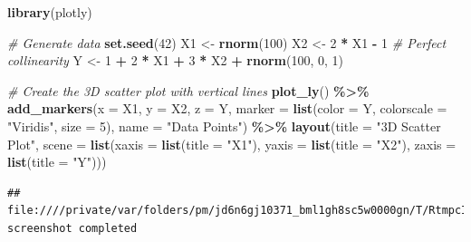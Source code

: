 \documentclass[
]{book}
\newenvironment{Shaded}{\begin{snugshade}}{\end{snugshade}}
\newcommand{\AttributeTok}[1]{\textcolor[rgb]{0.13,0.29,0.53}{#1}}
\newcommand{\CommentTok}[1]{\textcolor[rgb]{0.56,0.35,0.01}{\textit{#1}}}
\newcommand{\DecValTok}[1]{\textcolor[rgb]{0.00,0.00,0.81}{#1}}
\newcommand{\FunctionTok}[1]{\textcolor[rgb]{0.13,0.29,0.53}{\textbf{#1}}}
\newcommand{\NormalTok}[1]{#1}
\newcommand{\OtherTok}[1]{\textcolor[rgb]{0.56,0.35,0.01}{#1}}
\newcommand{\SpecialCharTok}[1]{\textcolor[rgb]{0.81,0.36,0.00}{\textbf{#1}}}
\newcommand{\StringTok}[1]{\textcolor[rgb]{0.31,0.60,0.02}{#1}}
\begin{document}
\begin{Shaded}
\begin{Highlighting}[]
\FunctionTok{library}\NormalTok{(plotly)}

\CommentTok{\# Generate data}
\FunctionTok{set.seed}\NormalTok{(}\DecValTok{42}\NormalTok{)}
\NormalTok{X1 }\OtherTok{\textless{}{-}} \FunctionTok{rnorm}\NormalTok{(}\DecValTok{100}\NormalTok{)}
\NormalTok{X2 }\OtherTok{\textless{}{-}} \DecValTok{2} \SpecialCharTok{*}\NormalTok{ X1 }\SpecialCharTok{{-}} \DecValTok{1}  \CommentTok{\# Perfect collinearity}
\NormalTok{Y  }\OtherTok{\textless{}{-}} \DecValTok{1} \SpecialCharTok{+} \DecValTok{2} \SpecialCharTok{*}\NormalTok{ X1 }\SpecialCharTok{+} \DecValTok{3} \SpecialCharTok{*}\NormalTok{ X2 }\SpecialCharTok{+} \FunctionTok{rnorm}\NormalTok{(}\DecValTok{100}\NormalTok{, }\DecValTok{0}\NormalTok{, }\DecValTok{1}\NormalTok{)}

\CommentTok{\# Create the 3D scatter plot with vertical lines}
\FunctionTok{plot\_ly}\NormalTok{() }\SpecialCharTok{\%\textgreater{}\%}
  \FunctionTok{add\_markers}\NormalTok{(}\AttributeTok{x =}\NormalTok{ X1, }\AttributeTok{y =}\NormalTok{ X2, }\AttributeTok{z =}\NormalTok{ Y, }
              \AttributeTok{marker =} \FunctionTok{list}\NormalTok{(}\AttributeTok{color =}\NormalTok{ Y, }\AttributeTok{colorscale =} \StringTok{"Viridis"}\NormalTok{, }\AttributeTok{size =} \DecValTok{5}\NormalTok{),}
              \AttributeTok{name =} \StringTok{"Data Points"}\NormalTok{) }\SpecialCharTok{\%\textgreater{}\%}
  \FunctionTok{layout}\NormalTok{(}\AttributeTok{title =} \StringTok{"3D Scatter Plot"}\NormalTok{,}
         \AttributeTok{scene =} \FunctionTok{list}\NormalTok{(}\AttributeTok{xaxis =} \FunctionTok{list}\NormalTok{(}\AttributeTok{title =} \StringTok{"X1"}\NormalTok{),}
                      \AttributeTok{yaxis =} \FunctionTok{list}\NormalTok{(}\AttributeTok{title =} \StringTok{"X2"}\NormalTok{),}
                      \AttributeTok{zaxis =} \FunctionTok{list}\NormalTok{(}\AttributeTok{title =} \StringTok{"Y"}\NormalTok{)))}
\end{Highlighting}
\end{Shaded}

\begin{verbatim}
## file:////private/var/folders/pm/jd6n6gj10371_bml1gh8sc5w0000gn/T/RtmpcINJCx/filebbb71e351437/widgetbbb72ec2365f.html screenshot completed
\end{verbatim}
\end{document}
